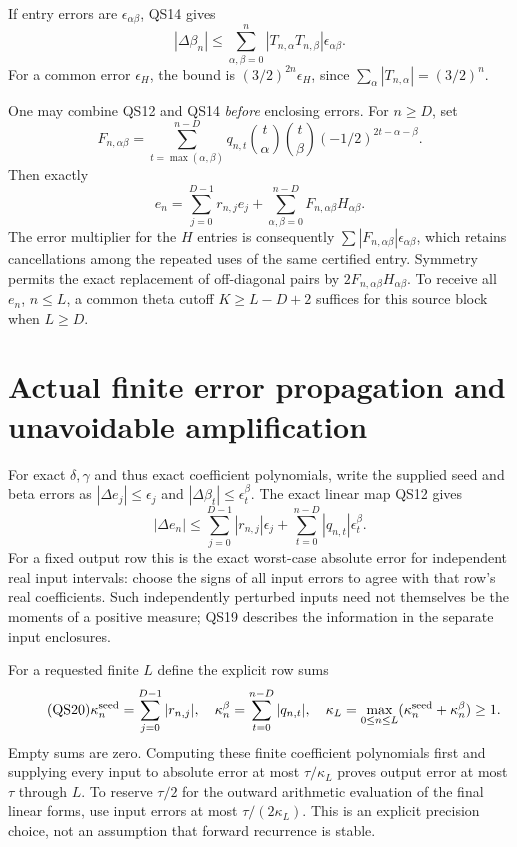 \documentclass[11pt]{article}
\begin{document}
If entry errors are \(\epsilon_{\alpha\beta}\), QS14 gives
\begin{equation}\tag{QS17}
 |\Delta\beta_n|
 \le\sum_{\alpha,\beta=0}^n
      |T_{n,\alpha}T_{n,\beta}|\epsilon_{\alpha\beta}.
\end{equation}
For a common error \(\epsilon_H\), the bound is
\((3/2)^{2n}\epsilon_H\), since
\(\sum_\alpha|T_{n,\alpha}|=(3/2)^n\).

One may combine QS12 and QS14 \emph{before} enclosing errors.
For \(n\ge D\), set
\begin{equation}\tag{QS18}
 F_{n,\alpha\beta}
 =\sum_{t=\max(\alpha,\beta)}^{n-D}
        q_{n,t}\binom t\alpha\binom t\beta
                     (-1/2)^{2t-\alpha-\beta}.
\end{equation}
Then exactly
\[
 e_n=\sum_{j=0}^{D-1}r_{n,j}e_j+
                  \sum_{\alpha,\beta=0}^{n-D}
                         F_{n,\alpha\beta}H_{\alpha\beta}.
\]
The error multiplier for the \(H\) entries is consequently
\(\sum|F_{n,\alpha\beta}|\epsilon_{\alpha\beta}\), which
retains cancellations among the repeated uses of the same
certified entry. Symmetry permits the exact replacement
of off-diagonal pairs by \(2F_{n,\alpha\beta}H_{\alpha\beta}\).
To receive all \(e_n\), \(n\le L\), a common theta cutoff
\(K\ge L-D+2\) suffices for this source block when \(L\ge D\).

\section{Actual finite error propagation and unavoidable amplification}

For exact \(\delta,\gamma\) and thus exact coefficient polynomials,
write the supplied seed and beta errors as
\(|\Delta e_j|\le\epsilon_j\) and
\(|\Delta\beta_t|\le\epsilon_t^\beta\).
The exact linear map QS12 gives
\begin{equation}\tag{QS19}
 |\Delta e_n|\le
 \sum_{j=0}^{D-1}|r_{n,j}|\epsilon_j+
               \sum_{t=0}^{n-D}|q_{n,t}|\epsilon_t^\beta .
\end{equation}
For a fixed output row this is the exact worst-case
absolute error for independent real input intervals:
choose the signs of all input errors to agree with that
row's real coefficients. Such independently perturbed
inputs need not themselves be the moments of a positive
measure; QS19 describes the information in the separate
input enclosures.

For a requested finite \(L\) define the explicit row sums
\begin{equation}\tag{QS20}
 \kappa_n^{\rm seed}=\sum_{j=0}^{D-1}|r_{n,j}|,\quad
 \kappa_n^\beta=\sum_{t=0}^{n-D}|q_{n,t}|,\quad
 \kappa_L=\max_{0\le n\le L}
                  (\kappa_n^{\rm seed}+\kappa_n^\beta)\ge1 .
\end{equation}
Empty sums are zero. Computing these finite coefficient
polynomials first and supplying every input to absolute
error at most \(\tau/\kappa_L\) proves output error at most
\(\tau\) through \(L\). To reserve \(\tau/2\) for the
outward arithmetic evaluation of the final linear forms,
use input errors at most \(\tau/(2\kappa_L)\).
This is an explicit precision choice, not an assumption
that forward recurrence is stable.
\end{document}
